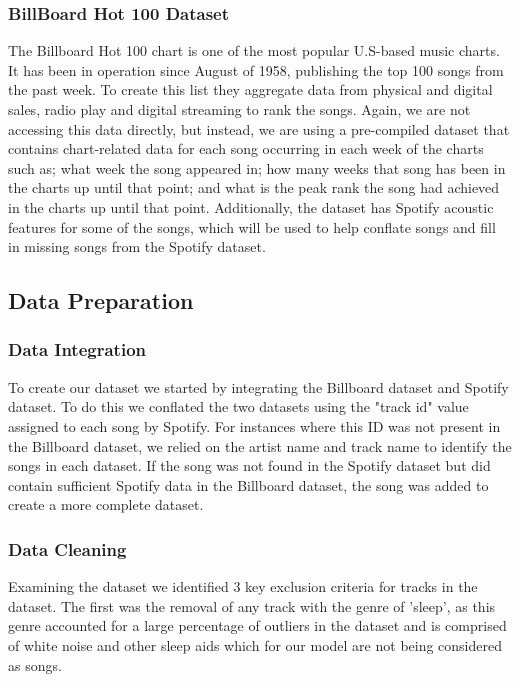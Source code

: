 \documentclass[conference]{IEEEtran}
\begin{document}
\subsubsection{BillBoard Hot 100 Dataset}
The Billboard Hot 100 chart is one of the most popular U.S-based music charts. It has been in operation since August of 1958, publishing the top 100 songs from the past week. To create this list they aggregate data from physical and digital sales, radio play and digital streaming to rank the songs.
Again, we are not accessing this data directly, but instead, we are using a pre-compiled dataset\cite{b19} that contains chart-related data for each song occurring in each week of the charts such as; what week the song appeared in; how many weeks that song has been in the charts up until that point; and what is the peak rank the song had achieved in the charts up until that point. Additionally, the dataset has Spotify acoustic features for some of the songs, which will be used to help conflate songs and fill in missing songs from the Spotify dataset.

\subsection{Data Preparation}
\subsubsection{Data Integration}

To create our dataset we started by integrating the Billboard dataset and Spotify dataset. To do this we conflated the two datasets using the "track id" value assigned to each song by Spotify. For instances where this ID was not present in the Billboard dataset, we relied on the artist name and track name to identify the songs in each dataset. If the song was not found in the Spotify dataset but did contain sufficient Spotify data in the Billboard dataset, the song was added to create a more complete dataset.

\subsubsection{Data Cleaning}

Examining the dataset we identified 3 key exclusion criteria for tracks in the dataset. The first was the removal of any track with the genre of 'sleep', as this genre accounted for a large percentage of outliers in the dataset and is comprised of white noise and other sleep aids which for our model are not being considered as songs.
\end{document}
